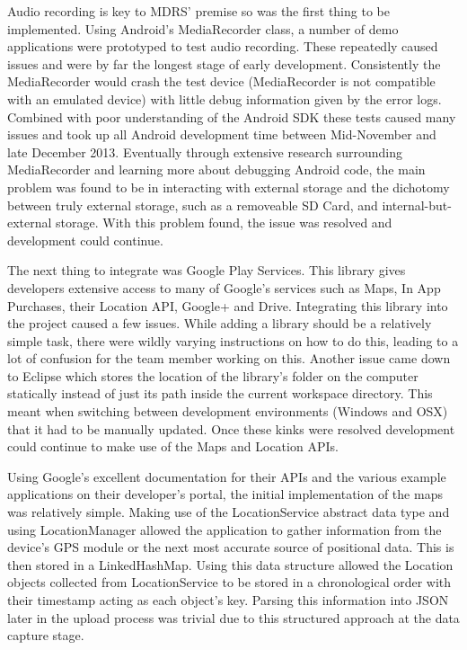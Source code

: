 \documentclass{l3proj}
\begin{document}
Audio recording is key to MDRS' premise so was the first thing to be
implemented. Using Android's MediaRecorder class, a number of demo applications
were prototyped to test audio recording. These repeatedly caused issues and were
by far the longest stage of early development. Consistently the MediaRecorder
would crash the test device (MediaRecorder is not compatible with an emulated
device) with little debug information given by the error logs. Combined with
poor understanding of the Android SDK these tests caused many issues and took up
all Android development time between Mid-November and late December 2013.
Eventually through extensive research surrounding MediaRecorder and learning
more about debugging Android code, the main problem was found to be in
interacting with external storage and the dichotomy between truly external
storage, such as a removeable SD Card, and internal-but-external storage. With
this problem found, the issue was resolved and development could continue.

The next thing to integrate was Google Play Services. This library gives
developers extensive access to many of Google's services such as Maps, In App
Purchases, their Location API, Google+ and Drive. Integrating this library into
the project caused a few issues. While adding a library should be a relatively
simple task, there were wildly varying instructions on how to do this, leading
to a lot of confusion for the team member working on this. Another issue came
down to Eclipse which stores the location of the library's folder on the
computer statically instead of just its path inside the current workspace
directory. This meant when switching between development environments (Windows
and OSX) that it had to be manually updated. Once these kinks were resolved
development could continue to make use of the Maps and Location APIs.

Using Google's excellent documentation for their APIs and the various example
applications on their developer's portal, the initial implementation of the maps
was relatively simple. Making use of the LocationService abstract data type and
using LocationManager allowed the application to gather information from the
device's GPS module or the next most accurate source of positional data. This is
then stored in a LinkedHashMap. Using this data structure allowed the Location
objects collected from LocationService to be stored in a chronological order
with their timestamp acting as each object's key. Parsing this information into
JSON later in the upload process was trivial due to this structured approach at
the data capture stage.
\end{document}
